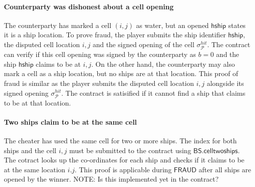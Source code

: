 \documentclass{llncs}
\newcommand{\gamefraud}{\mathsf{FRAUD}}
\newcommand{\hship}{\mathsf{hship}}
\newcommand{\participant}{\mathcal{P}}
\newcommand{\battleshiptwoships}{\mathsf{BS.celltwoships}}
\begin{document}
\paragraph{Counterparty was dishonest about a cell opening}
The counterparty has marked a cell $(i,j)$ as water, but an opened $\hship$ states it is a ship location. 
To prove fraud, the player submits the ship identifier $\hship$, the disputed cell location $i,j$ and the signed opening of the cell $\sigma^{hit}_{\participant}$. 
The contract can verify if this cell opening was signed by the counterparty as $b = 0$ and the ship $\hship$ claims to be at $i,j$.   
On the other hand, the counterparty may also mark a cell as a ship location,  but no ships are at that location.
This proof of fraud is similar as the player submits the disputed cell location $i,j$ alongside its signed opening $\sigma^{hit}_{\participant}$.
The contract is satisified if it cannot find a ship that claims to be at that location. 



\paragraph{Two ships claim to be at  the same cell} 
The cheater has used the same cell for two or more ships.  
The index for both ships and the cell $i,j$ must be submitted to the contract using $\battleshiptwoships$. 
The cotract looks up the co-ordinates for each ship and checks if it claims to be at the same location $i.j$.
This proof is applicable during $\gamefraud$ after all ships are opened by the winner. 
NOTE: Is this implemented yet in the contract? 
\end{document}
